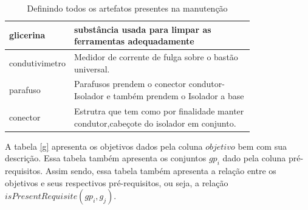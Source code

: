 \documentclass[12pt]{article}
\begin{document}
\begin{table}[H]
\begin{tabular}{|l|p{0.8\linewidth}|}
glicerina & substância usada para limpar as ferramentas adequadamente \\ \hline
condutivimetro & Medidor de corrente de fulga sobre o bastão universal. \\ \hline
parafuso & Parafusos prendem o conector condutor-Isolador e também prendem o Isolador a base \\ \hline
conector & Estrutra que tem como por finalidade manter condutor,cabeçote do isolador em conjunto. \\ \hline
\end{tabular}
\caption{Definindo todos os artefatos presentes na manutenção}
\label{artefacts}
\end{table} 

A tabela \ref{g} apresenta os objetivos dados pela coluna $objetivo$ bem com sua descrição. Essa tabela também apresenta os conjuntos $gp_i$ dado pela coluna pré-requisitos. Assim sendo, essa tabela também apresenta a relação entre os objetivos e seus respectivos pré-requisitos, ou seja, a relação $isPresentRequisite(gp_i,g_j)$. 
\end{document}
